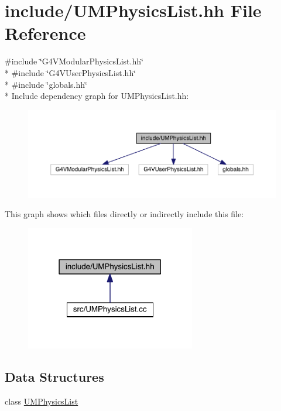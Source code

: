 \hypertarget{UMPhysicsList_8hh}{}\section{include/\+U\+M\+Physics\+List.hh File Reference}
\label{UMPhysicsList_8hh}
{\ttfamily \#include \char`\"{}G4\+V\+Modular\+Physics\+List.\+hh\char`\"{}}\\*
{\ttfamily \#include \char`\"{}G4\+V\+User\+Physics\+List.\+hh\char`\"{}}\\*
{\ttfamily \#include \char`\"{}globals.\+hh\char`\"{}}\\*
Include dependency graph for U\+M\+Physics\+List.\+hh\+:
\nopagebreak
\begin{figure}[H]
\begin{center}
\leavevmode
\includegraphics[width=350pt]{UMPhysicsList_8hh__incl}
\end{center}
\end{figure}
This graph shows which files directly or indirectly include this file\+:
\nopagebreak
\begin{figure}[H]
\begin{center}
\leavevmode
\includegraphics[width=210pt]{UMPhysicsList_8hh__dep__incl}
\end{center}
\end{figure}
\subsection*{Data Structures}
\begin{DoxyCompactItemize}
\item 
class \hyperlink{classUMPhysicsList}{U\+M\+Physics\+List}
\end{DoxyCompactItemize}
